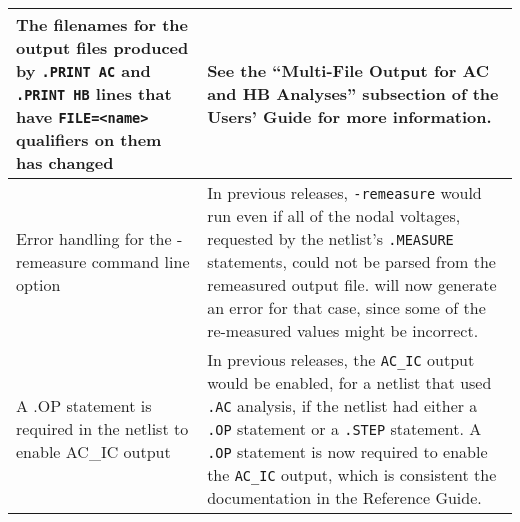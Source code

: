 {\begin{longtable}[h] {>{\raggedright\small}m{2in}|>{\raggedright\let\\\tabularnewline\small}m{3.5in}}
The filenames for the output files produced by \texttt{.PRINT AC} and
\texttt{.PRINT HB} lines that have \texttt{FILE=<name>} qualifiers
on them has changed & See the ``Multi-File Output for AC and HB Analyses'' 
subsection of the \Xyce{} Users' Guide for more information.  
\\ \hline

Error handling for the -remeasure command line option & In previous 
\Xyce{} releases, \texttt{-remeasure} would run even if all of the nodal
voltages, requested by the netlist's \texttt{.MEASURE} statements,
could not be parsed from the remeasured output file.  \Xyce{} will 
now generate an error for that case, since some of the re-measured 
values might be incorrect. \\ \hline

A .OP statement is required in the netlist to enable AC\_IC output & In
previous \Xyce{} releases, the \texttt{AC\_IC} output would be enabled,
for a netlist that used \texttt{.AC} analysis, if the netlist had
either a \texttt{.OP} statement or a \texttt{.STEP} statement.  A
\texttt{.OP} statement is now required to enable the \texttt{AC\_IC} 
output, which is consistent the documentation in the \Xyce{} Reference
Guide.

\\ \hline

\end{longtable}
}
